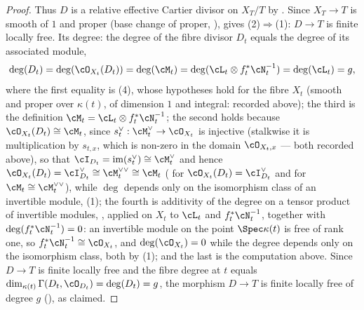 \begin{proof}
Thus $D$ is a relative effective Cartier divisor on $X_T/T$ by
.  Since $X_T\to T$ is smooth of
 $1$ and proper (base change of proper,
),  gives
(2)$\Rightarrow$(1): $D\to T$ is finite locally free.  Its degree: the
degree of the fibre divisor $D_t$ equals the degree of its associated
module,
\[
\deg(D_t)=\deg(\cO_{X_t}(D_t))=\deg(\cM_t)
=\deg(\cL_t\otimes f_t^*\cN_t^{-1})=\deg(\cL_t)=g ,
\]
where the first equality is
(4), whose hypotheses hold for the fibre
$X_t$ (smooth and proper over $\kappa(t)$, of dimension $1$ and integral:
recorded above); the third is the definition
$\cM_t=\cL_t\otimes f_t^*\cN_t^{-1}$; the second holds because
$\cO_{X_t}(D_t)\cong\cM_t$, since $s_t^\vee:\cM_t^\vee\to\cO_{X_t}$ is
injective (stalkwise it is multiplication by $s_{t,x}$, which is
non-zero in the domain $\cO_{X_t,x}$ --- both recorded above), so that
$\cI_{D_t}=\operatorname{im}(s_t^\vee)\cong\cM_t^\vee$ and hence
$\cO_{X_t}(D_t)=\cI_{D_t}^\vee\cong\cM_t^{\vee\vee}\cong\cM_t$
( for
$\cO_{X_t}(D_t)=\cI_{D_t}^\vee$ and 
for $\cM_t\cong\cM_t^{\vee\vee}$), while $\deg$ depends only on the
isomorphism class of an invertible module,
(1); the
fourth is additivity of the degree on a tensor product of invertible
modules, ,
applied on $X_t$ to $\cL_t$ and $f_t^*\cN_t^{-1}$, together with
$\deg(f_t^*\cN_t^{-1})=0$: an invertible module on the point
$\Spec\kappa(t)$ is free of rank one, so $f_t^*\cN_t^{-1}\cong\cO_{X_t}$,
and $\deg(\cO_{X_t})=0$ while the degree depends only on the isomorphism
class, both by (1); and the last is the
computation above.
Since $D\to T$ is finite locally free and the fibre degree at $t$ equals
$\dim_{\kappa(t)}\Gamma(D_t,\cO_{D_t})=\deg(D_t)=g$, the morphism
$D\to T$ is finite locally free of degree $g$
(), as claimed.
\end{proof}

